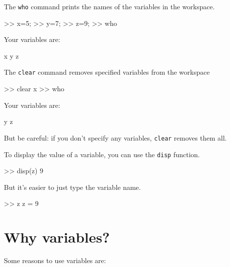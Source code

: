 \documentclass[
]{book}
\numberwithin{Answer}{chapter}
\numberwithin{Exercise}{chapter}
\begin{document}

The {\tt who} command prints the
names of the variables in the workspace.


\begin{code}
>> x=5;
>> y=7;
>> z=9;
>> who

Your variables are:

x  y  z
\end{code}

The {\tt clear} command removes specified variables from the workspace

\begin{code}
>> clear x
>> who

Your variables are:

y z
\end{code}

But be careful: if you don't specify any variables, {\tt clear} removes them all.


To display the value of a variable, you can use the {\tt disp} function.

\begin{code}
>> disp(z)
     9
\end{code}

But it's easier to just type the variable name.

\begin{code}
>> z
z = 9
\end{code}


\section{Why variables?}

Some reasons to use variables are:

\end{document}
